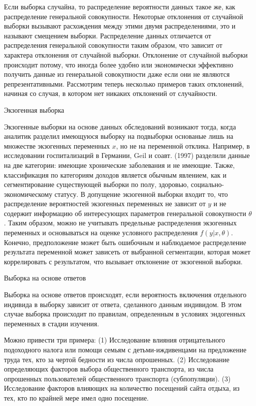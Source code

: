 Если выборка случайна, то распределение вероятности данных такое же, как распределение генеральной совокупности. Некоторые отклонения от случайной выборки вызывают расхождения между этими двумя распределениями, это и называют смещением выборки. Распределение данных отличается от распределения генеральной совокупности таким образом, что зависит от характера отклонения от случайной выборки. Отклонение от случайной выборки происходит потому, что иногда более удобно или экономически эффективно получить данные из генеральной совокупности даже если они не являются репрезентативными. Рассмотрим теперь несколько примеров таких отклонений, начиная со случая, в котором нет никаких отклонений от случайности.

\begin{center}
Экзогенная выборка
\end{center}


Экзогенные выборки на основе данных обследований возникают тогда, когда аналитик разделил имеющуюся выборку на подвыборки основаные лишь на множестве экзогенных переменных $x$, но не на переменной отклика. Например, в исследовании госпитализаций в Германии, Geil и соавт. (1997) разделили данные на две категории: имеющие хронические заболевания и не имеющие. Также, классификация по категориям доходов является обычным явлением, как и сегментирование существующей выборки по полу, здоровью, социально-экономическому статусу. В допущение экзогенной выборки входит то, что распределение вероятностей экзогенных переменных не зависит от $y$ и не содержит информацию об интересующих параметров генеральной совокупности $\theta$. Таким образом, можно не учитывать предельные распределения экзогенных переменных и основываться на оценке условного распределения $f(y|x,\theta)$. Конечно, предположение может быть ошибочным и наблюдаемое распределение результата переменной может зависеть от выбранной сегментации, которая может коррелировать с результатом, что вызывает отклонение от экзогенной выборки.



\begin{center}
Выборка на основе ответов
\end{center}

Выборка на основе ответов происходят, если вероятность включения отдельного индивида в выборку зависит от ответа,  сделанного данным индивидом. В этом случае выборка происходит по правилам, определенным в условиях эндогенных переменных в стадии изучения.


Можно привести три примера: (1) Исследование влияния отрицательного подоходного налога или помощи семьям с детьми-иждивенцами на предложение труда тех, кто за чертой бедности из числа опрошенных. (2) Исследование определяющих факторов выбора общественного транспорта, из числа опрошенных пользователей общественного транспорта (субпопуляции). (3) Исследование факторов влияющих на количество посещений сайта отдыха, из тех, кто по крайней мере имел одно посещение.


